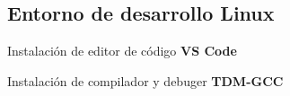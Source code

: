 \subsection{Entorno de desarrollo Linux}
\begin{frame}[fragile]{Instalación de editor de código}
  \textbf{VS Code}
\end{frame}


\begin{frame}[fragile]{Instalación de compilador y debuger}
  \textbf{TDM-GCC}
\end{frame}
